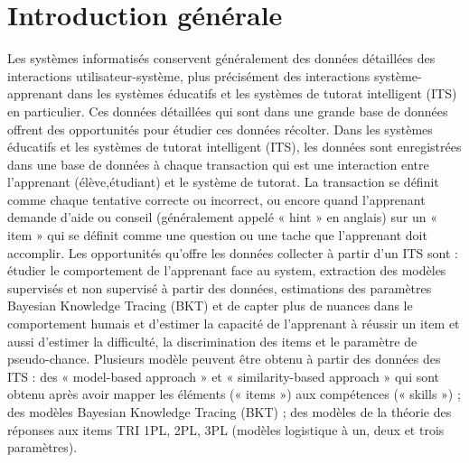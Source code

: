 \chapter*{Introduction générale}
Les systèmes informatisés conservent généralement des données détaillées des interactions utilisateur-système, plus précisément des interactions système-apprenant dans les systèmes éducatifs et les systèmes de tutorat intelligent (ITS) en particulier. Ces données détaillées qui sont dans une grande base de données offrent des opportunités pour étudier ces données récolter. Dans les systèmes éducatifs et les systèmes de tutorat intelligent (ITS), les données sont enregistrées dans une base de données à chaque transaction qui est une interaction entre l'apprenant (élève,étudiant) et le système de tutorat. La transaction se définit comme chaque tentative correcte ou incorrect, ou encore quand l’apprenant demande d’aide ou conseil (généralement appelé « hint » en anglais) sur un « item » qui se définit comme une question ou une tache que l’apprenant doit accomplir. Les opportunités qu’offre les données collecter à partir d’un ITS sont : étudier le comportement de l’apprenant face au system, extraction des modèles supervisés et non supervisé à partir des données, estimations des paramètres Bayesian Knowledge Tracing (BKT) et de capter plus de nuances dans le comportement humais et d’estimer la capacité de l’apprenant à réussir un item et aussi d’estimer la difficulté, la discrimination des items et le paramètre de pseudo-chance. Plusieurs modèle peuvent être obtenu à partir des données des ITS : des « model-based approach » et « similarity-based approach » qui sont obtenu après avoir mapper les éléments (« items ») aux compétences (« skills ») ; des modèles Bayesian Knowledge Tracing (BKT) ; des modèles de la théorie des réponses aux items TRI 1PL, 2PL, 3PL (modèles logistique à un, deux et trois paramètres). \\

